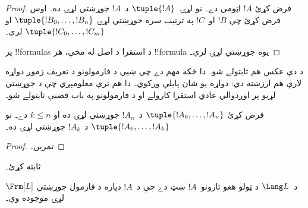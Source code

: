 \documentclass[../../../include/open-logic-section]{subfiles}
\begin{document}
\begin{proof}
فرض کړئ $!A$ اټومي دے۔ نو لړۍ~$\tuple{!A}$ د~$!A$ جوړښتي لړۍ ده۔
%
اوس فرض کړئ چې $!B$ او~$!C$ په ترتيب سره جوړښتي لړۍ
$\tuple{!B_0,\dotsc,!B_n}$ او $\tuple{!C_0,\dotsc,!C_m}$ لري۔
%
\begin{enumerate}
\end{enumerate}
پر !!{formula}s د استقرا د اصل له مخې، هر !!{formula} يوه جوړښتي لړۍ
لري۔
\end{proof}

د دې عکس هم ثابتولے شو۔ دا ځکه مهم دے چې ښيي د فارمولونو د تعريف
زموږ دواړه لارې هم ارزښته دي: دواړه يو شان پايلې ورکوي۔ دا هم ترې
معلومېږي چې د جوړښتي لړيو پر اوږدوالي عادي استقرا کارولے او د
فارمولونو په باب قضيې ثابتولے شو۔

\begin{lem}
فرض کړئ $\tuple{!A_0,\dotsc,!A_n}$ د~$!A_n$ جوړښتي لړۍ ده او $k
\leq n$ دے۔ نو $\tuple{!A_0,\dotsc,!A_k}$ د~$!A_k$ جوړښتي لړۍ ده۔
\end{lem}

\begin{proof}
تمرين۔
\end{proof}

\begin{prob}
 ثابته کړئ۔
\end{prob}

\begin{thm}
$\Frm[L]$ د~$\Lang L$ د ټولو هغو تارونو~$!A$ سټ دے چې د~$!A$ دپاره
د فارمول جوړښتي لړۍ موجوده وي۔
\end{thm}
\end{document}
